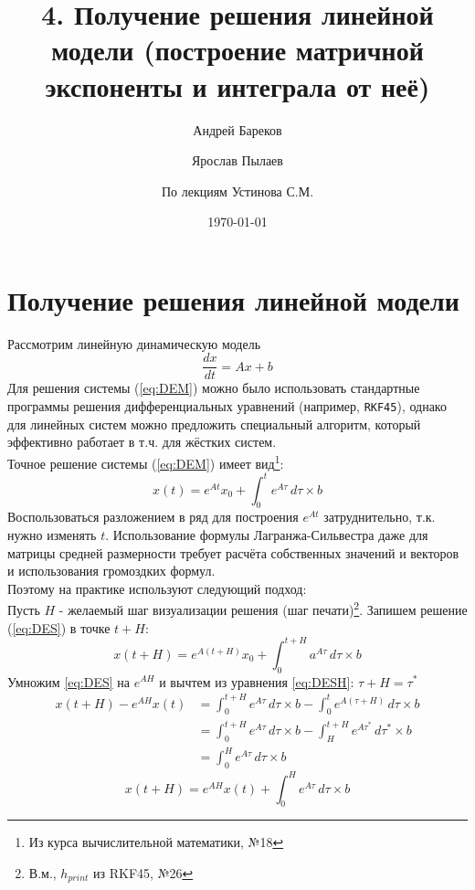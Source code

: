 \documentclass[a4paper,11pt]{article}
\title{4. Получение решения линейной модели (построение матричной экспоненты и интеграла от неё)}
\author{Андрей Бареков \and Ярослав Пылаев \and По лекциям Устинова С.М.}
\date{\today}
\begin{document}
\maketitle
\newpage

\section{Получение решения линейной модели}
Рассмотрим линейную динамическую модель
\begin{equation}
  \frac{dx}{dt} = Ax + b
  \label{eq:DEM}
\end{equation}
Для решения системы (\ref{eq:DEM}) можно было использовать стандартные программы решения дифференциальных уравнений (например, \verb|RKF45|), однако для линейных систем можно предложить специальный алгоритм, который эффективно работает в т.ч. для жёстких систем. \\
Точное решение системы (\ref{eq:DEM}) имеет вид\footnote{Из курса вычислительной математики, №18}:
\begin{equation}
  x(t) = e^{At}x_0 + \int_0^t e^{A\tau}\,d\tau \times b
  \label{eq:DES}
\end{equation}
Воспользоваться разложением в ряд для построения $e^{At}$ затруднительно, т.к. нужно изменять $t$. Использование формулы Лагранжа-Сильвестра даже для матрицы
  средней размерности требует расчёта собственных значений и векторов и использования громоздких формул. \\
  Поэтому на практике используют следующий подход: \\
Пусть $H$ - желаемый шаг визуализации решения (шаг печати)\footnote{В.м., $h_{print}$ из RKF45, №26}. Запишем решение (\ref{eq:DES}) в точке $t+H$:
\begin{equation}
  x(t + H) = e^{A(t+H)}x_0 + \int_0^{t+H}a^{A\tau}\,d\tau \times b
  \label{eq:DESH} 
\end{equation}
Умножим \ref{eq:DES} на $e^{AH}$ и вычтем из уравнения \ref{eq:DESH}:
\marginpar
{
  $\tau + H = \tau^*$
}
\begin{align*}
  x(t + H) - e^{AH} x(t) &= \int_0^{t+H} e^{A\tau}\,d\tau \times b - \int_0^t e^{A(\tau + H)}\,d\tau \times b \\
                         &= \int_0^{t+H} e^{A\tau}\,d\tau \times b - \int_H^{t+H} e^{A\tau^*}\,d\tau^* \times b \\
                         &= \int_0^H e^{A\tau}\,d\tau \times b
\end{align*}
\begin{equation}
  x(t + H) = e^{AH}x(t) + \int_0^H e^{A\tau}\,d\tau \times b
  \label{eq:DESHF}
\end{equation}
\end{document}
